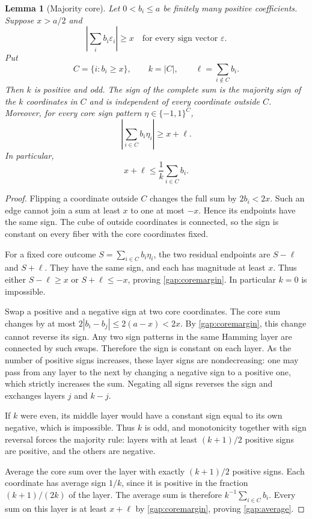 \documentclass[11pt]{article}
\newtheorem{lemma}[theorem]{Lemma}
\theoremstyle{remark}\newtheorem{remark}[theorem]{Remark}
\begin{document}
\begin{lemma}[Majority core]\label{gap:majority}
Let $0<b_i\le a$ be finitely many positive coefficients. Suppose
$x>a/2$ and
\begin{equation}\label{gap:empty}
 \left|\sum_i b_i\varepsilon_i\right|\ge x
 \quad\text{for every sign vector }\varepsilon.
\end{equation}
Put
\[
 C=\{i:b_i\ge x\},\qquad k=|C|,\qquad
 \ell=\sum_{i\notin C}b_i.
\]
Then $k$ is positive and odd. The sign of the complete sum is the
majority sign of the $k$ coordinates in $C$ and is independent of
every coordinate outside $C$.
Moreover, for every core sign pattern $\eta\in\{-1,1\}^C$,
\begin{equation}\label{gap:coremargin}
 \left|\sum_{i\in C}b_i\eta_i\right|\ge x+\ell.
\end{equation}
In particular,
\begin{equation}\label{gap:average}
 x+\ell\le\frac1k\sum_{i\in C}b_i.
\end{equation}
\end{lemma}
\begin{proof}
Flipping a coordinate outside $C$ changes the full sum by
$2b_i<2x$. Such an edge cannot join a sum at least $x$ to one at
most $-x$. Hence its endpoints have the same sign. The cube of
outside coordinates is connected, so the sign is constant on every
fiber with the core coordinates fixed.

For a fixed core outcome $S=\sum_{i\in C}b_i\eta_i$, the two
residual endpoints are $S-\ell$ and $S+\ell$. They have the same
sign, and each has magnitude at least $x$. Thus either
$S-\ell\ge x$ or $S+\ell\le-x$, proving
\eqref{gap:coremargin}. In particular $k=0$ is impossible.

Swap a positive and a negative sign at two core coordinates. The
core sum changes by at most
$2|b_i-b_j|\le2(a-x)<2x$.
By \eqref{gap:coremargin}, this change cannot reverse its sign.
Any two sign patterns in the same Hamming layer are connected by
such swaps. Therefore the sign is constant on each layer.
As the number of positive signs increases, these layer signs are
nondecreasing: one may pass from any layer to the next by changing
a negative sign to a positive one, which strictly increases the sum.
Negating all signs reverses the sign and exchanges layers $j$ and
$k-j$.

If $k$ were even, its middle layer would have a constant sign equal
to its own negative, which is impossible. Thus $k$ is odd, and
monotonicity together with sign reversal forces the majority rule:
layers with at least $(k+1)/2$ positive signs are positive, and the
others are negative.

Average the core sum over the layer with exactly $(k+1)/2$ positive
signs. Each coordinate has average sign $1/k$, since it is positive
in the fraction $(k+1)/(2k)$ of the layer. The average sum is
therefore $k^{-1}\sum_{i\in C}b_i$.
Every sum on this layer is at least $x+\ell$ by
\eqref{gap:coremargin}, proving \eqref{gap:average}.
\end{proof}
\end{document}
